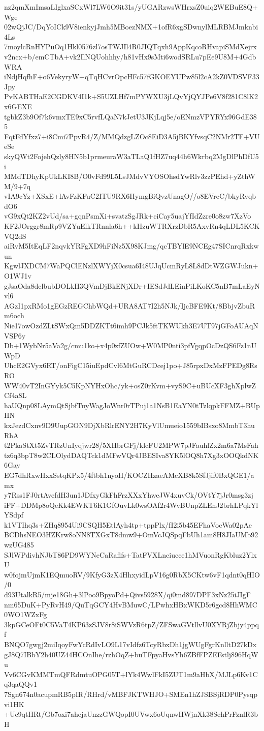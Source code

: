 nz2qmXmImsaLIglxaSCxWl7LW6O9it31s/yUGARzwsWHrxsZ0uiq2WEBuE8Q+Wge
02wQjJC/DqYoICk9V8ienkyjJmh5MBoezNMX+1ofR6xgSDwnylMLRBMJmknbi4Ls
7moylcRnHYPuOq1Hkl0576zl7osTWJIl4R0JIQTqxh9AppKqcoRHvapiSMdXejrx
v2ncx+b/emCTbA+vk2IlNQUohhhy/h81vHx9sMti6wodSRLu7pEe9U8M+4GdbWRA
iNdjHqfhF+o6VekyryW+qTqHCvrOpcHFc57fGKOEYUPw85l2cA2kZ0VDSVF33Jpy
PvKABTHaE2CGDKV4I1k+S5UZLHf7mPYWXU3jLQvYjQYJPe6V8f281C8lK2x6GEXE
tgbkZ3b9Of7k6vmxTE9xC5rvfLQaN7kJetU3JKjLqj5e/oENmzVPYRYx96GdE385
FqtFdYfxz7+i8Cmi7PpvR4/Z/MMQdzgLZOc8EiD3A5jBKYfvsqC2NMr2TF+VUeSe
skyQWt2FojehQzly8HN5b1prmeuraW3aTLaQ1fHZ7uq44h6Wkrbq2MgDlPhDfU5i
MMdTDhyKpUkLKI8B/O0vFd99L5LsJMdvVYOSOhsdYwRlv3zzPEhd+yZthWM/9+7q
vIA9cYz+XSxE+lAvFzKFuC2ITU9RX6HymgBiQvzUnagO//o8EVreC/bkyRvqbdO6
vG9xQt2KZ2vUd/sa+gqnPsmXi+svatzSgJRk+ciCay5uajYfIdZzre0o8zw7XzVo
KF2JOrggr8mRp9VZYuElkTRnnla6h++kHzuWTRXrzDbR5AxvRn4qLDL5KCKVQ2dS
aiRvM5ItEqLF2nqvkYRFgXD9hFiNz5X98KJmg/qcTBYlE9NCEg47SICnrqRxkwun
KgwlJXDCM7WaPQClENzlXWYjX0csua6I48UJqUcmRyL8L8dDtWZGWJukn+O1WJ1v
gJsaOda8dclbubDOLkH3QVmDjBkENjXDr+IESdJdLEinPiLKoKC5nB7mLaEyNvl6
AGzI1pxRMo1gEGzREGChbWQd+URA8AT7I2h5NJk/IjcBFE9Kt/8BbjvZbuRm6och
Nie17owOzdZLtSWxQm5DDZKTt6imh9PCJk5ftTKWUkh3E7UT97jGFoAUAqNVSP6y
Db+1WybNr5aVa2g/cmu1ko+x4p0zfZUOw+W0MP0nti3pfVgqpOcDzQS6Fz1nUWpD
UhcE2GVyx6RT/onFigC15iuEpdCvl6MtGuRCDcej1po+J85rpxDxMzFPEDg8RsRO
WW40vT2InGYyk5C5KpNYHxOhc/yk+osZ0rKvm+vyS9C+uBUcXF3ghXplwZCf4a8L
haUQnp08LAymQtSjbfTuyWagJoWnr0rTPuj1a1NsB1EaYN0tTzlqpkFFMZ+BUpHN
kxJezdCxnv9D9UupGON9DjXbRlrENY2H7KyVlUmueio1559bIBsxo8MmbT3huRhA
t2PkaStXt5ZvTRzUnIyqjwr28/5XHbrGFj/klcFU2MPW7pJFauhlZx2m6a7MsFah
tz6q3bpT8w2CLOlydDAQTck1dMFwVQr4JBESIva8YK5lOQ8h7Xg3xOOQkdNK6Gay
EG7dhRxwHxxSstqKPx5/4ftbh1nyoH/KOCZHzaeAMcXB8k5SfJjif0BxQGE1/amx
y7Rss1FJ0rtAvefdH3un1JDfxyGkFhFrzXXxYhweJW4xuvCk/OVtY7jJr0msg3zj
iFF+DDMp8oQeKk4EWKT6K1GfOuvLk0wsOAf2r4WvBUnpZLEnJ2brhLPqkYlYSdpf
k1VTIhq3s+ZHq8954Ui9CSQH5EtlAyh4tp+tppPlx/fI2i5b45EFhaVocWa02pAe
BCDhsNEO3HZKrw8oNN8TXGxT8dmw9+OmVcJQSpqFbUh1am8H8JIaUMb92wzUG485
SJlWPdivhNJbT86PD9WYNeCaRaflfs+TatFVXLnciucce1hMVuonRgKbluz2YlxU
w0fojmUjmK1EQmuoRV/9KfyG3zX4HhxyidLpV16g0RbX5CKtw6vF1qdnt0qHIO/0
d93UtalkR5/mje18Gh+3lPoo9BpyoPd+Qivs5928X/qi0md897DPF3xNz25iJIgF
nm65DuK+PyRvH49/QuTqGCY4HvBMuwC/LPwhxHBxWKD5r6gcd8HhWMC0WO1WZxFg
3kpGCeOFt0C5VaT4KP63zSJV8r8iSWVzR6tpZ/ZFSwaGVtllvU0XYRjZbjy4ppqf
BNQO7gwgj2miIqoyFwYcRdIvLO9L17vIdfz6TcyRbxDh1jgWUgFgrKnlltD27kDx
gJ8Q7IBbY2h40UZ44HCOnIhe/rzhOqZ+buTFpyaHvsYh6ZBfFPZEFstlj896HqWu
Vv6CGvKMMTmQFRdmtuOPG05T+lYk4WwlFkI5ZUT1m9aHbX/MJLp6Kv1Cq3qaQQv1
7Sgn674n0acupmRB5pIR/RHrd/vMBFJKTWHJO+SMEn1hZJSBSjRDP0Pysqpvi1HK
+Uc9qtHRt/Gb7oxi7ahejaUnzzGWQopI0UVwx6oUqnwHWjnXk38SehPrFznlR3bH
